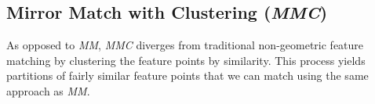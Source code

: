 \documentclass[12pt,journal,compsoc]{IEEEtran}
\begin{document}
\subsection{Mirror Match with Clustering (\emph{MMC})}
%
As opposed to \emph{MM}, \emph{MMC} diverges from traditional 
non-geometric feature matching by clustering the feature points by 
similarity. This process yields partitions of fairly similar feature 
points that we can match using the same approach as \emph{MM}. 
%
%
%
%
\end{document}
